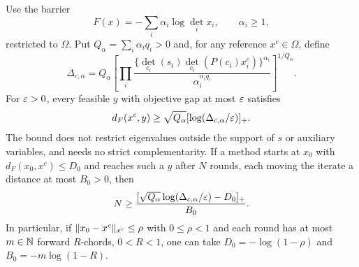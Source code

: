 \begin{theorem}
\label{thm:exposed-rank}
Use the barrier
\[ F(x)=-\sum_i\alpha_i\log\det_i x_i,\qquad \alpha_i\geq1, \]
restricted to $\Omega$. Put $Q_\alpha=\sum_i\alpha_iq_i>0$ and, for
any reference $x^c\in\Omega$, define
\begin{equation}
 \Delta_{c,\alpha}=Q_\alpha
 \left[\prod_i
 \frac{\{\det_{c_i}(s_i)\det_{c_i}(P(c_i)x_i^c)\}^{\alpha_i}}
      {\alpha_i^{\alpha_iq_i}}\right]^{1/Q_\alpha}.
 \label{eq:weighted-exposed-scale}
\end{equation}
For $\varepsilon>0$, every feasible $y$ with objective gap at most $\varepsilon$
satisfies
\begin{equation}
 d_F(x^c,y)\geq\sqrt{Q_\alpha}
            [\log(\Delta_{c,\alpha}/\varepsilon)]_+.
 \label{eq:exposed-distance}
\end{equation}
The bound does not restrict eigenvalues outside the support of $s$ or
auxiliary variables, and needs no strict complementarity. If a method starts at $x_0$ with
$d_F(x_0,x^c)\leq D_0$ and reaches such a $y$ after $N$ rounds,
each moving the iterate a distance at most $B_0>0$, then
\begin{equation}
 N\geq\frac{[\sqrt{Q_\alpha}\log(\Delta_{c,\alpha}/\varepsilon)-D_0]_+}{B_0}.
 \label{eq:exposed-rounds}
\end{equation}
In particular, if $\lVert x_0-x^c\rVert_{x^c}\leq\rho$ with $0\leq\rho<1$
and each round has at most $m\in\mathbb N$ forward $R$-chords, $0<R<1$,
one can take $D_0=-\log(1-\rho)$ and
$B_0=-m\log(1-R)$.
\end{theorem}
